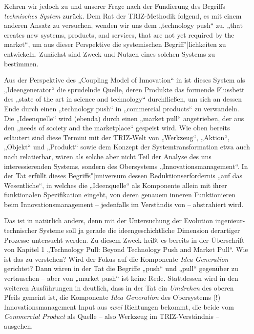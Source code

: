 \documentclass[12pt,a4paper]{article}
\begin{document}
Kehren wir jedoch zu \cite{TESE2018} und unserer Frage nach der Fundierung des
Begriffs \emph{technisches System} zurück. Dem Rat der TRIZ-Methodik folgend,
es mit einem anderen Ansatz zu versuchen, wenden wir uns dem „technology push“
\cite[S. 2]{TESE2018} zu, „that creates new systems, products, and services,
that are not yet required by the market“, um aus dieser Perspektive die
systemischen Begriff"|lichkeiten zu entwickeln.  Zunächst sind Zweck und
Nutzen eines solchen Systems zu bestimmen.

Aus der Perspektive des „Coupling Model of Innovation“ in
\cite[Fig. 3]{Preez2006} ist dieses System als „Ideengenerator“ die sprudelnde
Quelle, deren Produkte das formende Flussbett des „state of the art in science
and technology“ durchfließen, um sich an dessen Ende durch einen „technology
push“ in „commercial products“ zu verwandeln.  Die „Ideenquelle“ wird (ebenda)
durch einen „market pull“ angetrieben, der aus den „needs of society and the
marketplace“ gespeist wird. Wie oben bereits erläutert sind diese Termini mit
der TRIZ-Welt von „Werkzeug“, „Aktion“, „Objekt“ und „Produkt“ sowie dem
Konzept der Systemtransformation etwa auch nach \cite{TT} relatierbar, wären
als solche aber nicht Teil der Analyse des uns interessierenden Systems,
sondern des Obersystems „Innovationsmanagement“. In der Tat erfüllt dieses
Begriffs"|universum dessen Reduktionserfordernis „auf das Wesentliche“, in
welches die „Ideenquelle“ als Komponente allein mit ihrer funktionalen
Spezifikation eingeht, von deren genauem inneren Funktionieren beim
Innovationsmanagement -- jedenfalls im Verständis von \cite{Preez2006} --
abstrahiert wird.
\enlargethispage{-2em}

Das ist in \cite{TESE2018} natürlich anders, denn mit der Untersuchung der
Evolution ingenieur-technischer Systeme soll ja gerade die ideengeschichtliche
Dimension derartiger Prozesse untersucht werden.  Zu diesem Zweck heißt es
bereits in der Überschrift von Kapitel 1 „Technology Pull: Beyond Technology
Push and Market Pull“.  Wie ist das zu verstehen? Wird der Fokus auf die
Komponente \emph{Idea Generation} gerichtet? Dann wären in der Tat die
Begriffe „push“ und „pull“ gegenüber \cite{Preez2006} zu vertauschen -- aber
von „market push“ ist keine Rede.  Stattdessen wird in den weiteren
Ausführungen in \cite{TESE2018} deutlich, dass in der Tat ein \emph{Umdrehen}
des oberen Pfeils gemeint ist, die Komponente \emph{Idea Generation} des
Obersystems (!) Innovationsmanagement Input aus \emph{zwei} Richtungen
bekommt, die beide vom \emph{Commercial Product} als Quelle -- also Werkzeug
im TRIZ-Verständnis -- ausgehen.
\end{document}
